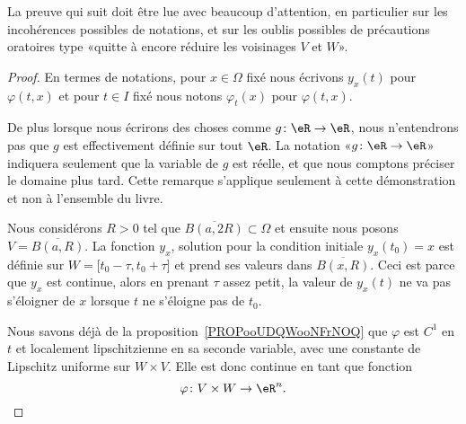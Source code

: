 \begin{probleme}
	La preuve qui suit doit être lue avec beaucoup d'attention, en particulier sur les incohérences possibles de notations, et sur les oublis possibles de précautions oratoires type «quitte à encore réduire les voisinages \( V\) et \( W\)».
\end{probleme}

\begin{proof}
	En termes de notations, pour \( x\in \Omega \) fixé nous écrivons \( y_x(t)\) pour \( \varphi(t,x)\) et pour \( t\in I\) fixé nous notons \( \varphi_t(x)\) pour \( \varphi(t,x)\).

	De plus lorsque nous écrirons des choses comme \( g\colon \eR\to \eR\), nous n'entendrons pas que \( g\) est effectivement définie sur tout \( \eR\). La notation «\( g\colon \eR\to \eR\)» indiquera seulement que la variable de \( g\) est réelle, et que nous comptons préciser le domaine plus tard. Cette remarque s'applique seulement à cette démonstration et non à l'ensemble du livre.

	Nous considérons \( R>0\) tel que \( \overline{ B(a,2R) }\subset\Omega\) et ensuite nous posons \( V=\overline{ B(a,R) }\). La fonction \( y_x\), solution pour la condition initiale \( y_x(t_0)=x\) est définie sur \( W=\mathopen[ t_0-\tau , t_0+\tau  \mathclose]\) et prend ses valeurs dans \( \overline{ B(x,R) }\). Ceci est parce que \( y_x\) est continue, alors en prenant \( \tau\) assez petit, la valeur de \( y_x(t)\) ne va pas s'éloigner de \( x\) lorsque \( t\) ne s'éloigne pas de \( t_0\).

	Nous savons déjà de la proposition~\ref{PROPooUDQWooNFrNOQ} que \( \varphi\) est \( C^1\) en \( t\) et localement lipschitzienne en sa seconde variable, avec une constante de Lipschitz uniforme sur \( W\times V\). Elle est donc continue en tant que fonction
	\begin{equation}
		\varphi\colon V\times W\to \eR^n.
	\end{equation}


\end{proof}
